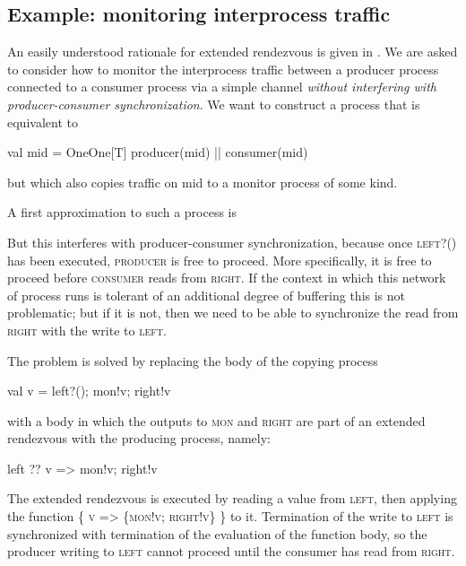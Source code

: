 \documentclass[12pt]{IOS-Book-Article-CPA-2017}
\begin{document}
\subsection{Example: monitoring interprocess traffic}

An easily understood rationale for extended rendezvous is given in
\cite{jcsp}. We are asked to consider how to monitor the interprocess
traffic between a producer process connected to a  consumer process
via a simple channel \textit{without interfering with producer-consumer
synchronization}.
%
We want to construct a process that is equivalent to
\begin{code+}[...]{}
        { val mid = OneOne[T]
          producer(mid) || consumer(mid)
        }
\end{code+}
but which also copies traffic on mid to a monitor process of
some kind.

A first approximation to such a process is
\begin{code+}[...]{}
        { val left, mon, right = OneOne[T]
          (  producer(left) 
          || proc { repeat { val v = left?(); mon!v; right!v }
          || consumer(right)
          || monitor(mon)
          )
        }
\end{code+}
But this interferes with producer-consumer synchronization,
because once \textsc{left?()} has been executed, \textsc{producer}
is free to proceed. More specifically, it is free to proceed before
\textsc{consumer} reads from \textsc{right}. If the context in which
this network of process runs is {tolerant} of an additional
degree of buffering this is not problematic; but if it is not,
then we need to be able to synchronize the read from \textsc{right}
with the write to \textsc{left}.

The problem is solved by replacing the body of the copying process
\begin{code+}[...]{}
          { val v = left?(); mon!v; right!v }
\end{code+}
with a body in which the outputs to \textsc{mon} and \textsc{right} 
are part of an extended rendezvous with the producing process, namely:
\begin{code+}[]{}
          { left ?? { v => {mon!v; right!v} } }
\end{code+}

The extended rendezvous is executed by reading a value from \textsc{left}, then
applying the function \textsc{\{ v => \{mon!v; right!v\} \}} to it.
Termination of the write to \textsc{left} is synchronized with termination
of the evaluation of the function body, so the producer writing to \textsc{left}
cannot proceed until the consumer has read from \textsc{right}.
\end{document}
